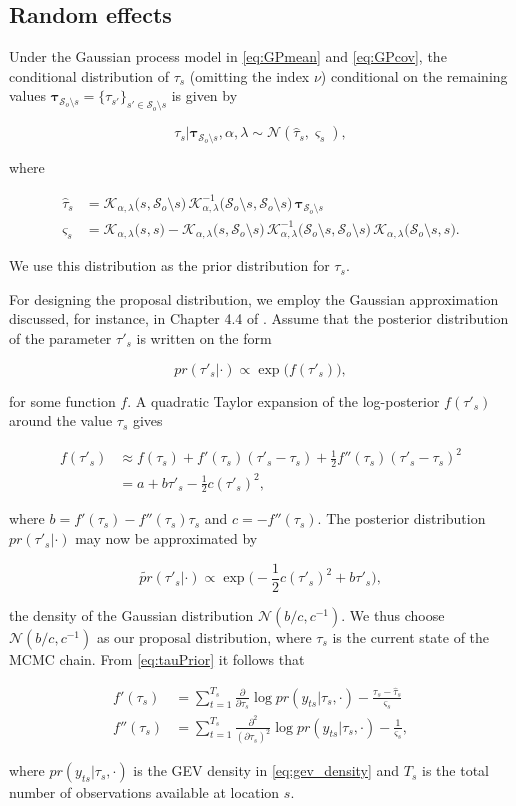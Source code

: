 \documentclass[11pt,english]{article}
\newcommand{\bs}[1]{\boldsymbol{#1}}
\newcommand{\mc}[1]{\mathcal{#1}}
\newcommand{\pderiv}[2]{\frac{\partial #1}{\partial #2}}
\newcommand{\pderivsq}[1]{\frac{\partial^2}{(\partial #1)^2}}
\newcommand{\bl}{\begin{linenomath}}
\newcommand{\el}{\end{linenomath}}
\begin{document}
\subsection{Random effects}

Under the Gaussian process model in \eqref{eq:GPmean} and \eqref{eq:GPcov}, the conditional distribution of $\tau_s$ (omitting the index $\nu$) conditional on the remaining values $\bs{\tau}_{\mc{S}_o \setminus s} = \{ \tau_{s'} \}_{s' \in \mc{S}_o \setminus s}$ is given by 
\bl\begin{equation}\label{eq:tauPrior}
\tau_s | \bs{\tau}_{\mc{S}_o \setminus s}, \alpha, \lambda \sim \mc{N} (\hat{\tau}_s, \varsigma_s),
\end{equation}\el
where 
\bl\begin{align*}
\hat{\tau}_s &= \mc{K}_{\alpha, \lambda}\big(s,\mc{S}_o\setminus s \big) \, \mc{K}^{-1}_{\alpha,\lambda}\big(\mc{S}_o\setminus s, \mc{S}_o\setminus s \big) \, \bs{\tau}_{\mc{S}_o\setminus s}\\
\varsigma_s &= \mc{K}_{\alpha, \lambda}\big(s,s\big) - \mc{K}_{\alpha, \lambda}\big(s,\mc{S}_o\setminus s \big) \, \mc{K}^{-1}_{\alpha,\lambda}\big(\mc{S}_o\setminus s, \mc{S}_o\setminus s\big) \, \mc{K}_{\alpha, \lambda}\big(\mc{S}_o\setminus s,s\big).
\end{align*}\el
We use this distribution as the prior distribution for $\tau_s$. 

For designing the proposal distribution, we employ the Gaussian approximation discussed, for instance, in Chapter 4.4 of \cite{RueHeld2005}.  Assume that the posterior distribution of the parameter $\tau'_s$ is written on the form
\bl\[
pr(\tau'_s| \cdot) \propto \exp \big( f(\tau'_s) \big),
\]\el
for some function $f$.  A quadratic Taylor expansion of the log-posterior $f(\tau'_s)$ around the value $\tau_s$ gives 
\bl\begin{align*}
f(\tau'_s) & \approx f(\tau_s) + f'(\tau_s) ( \tau'_s - \tau_s) + \frac{1}{2} f''(\tau_s) (\tau'_s - \tau_s)^2 \\
& = a + b \tau'_s - \frac{1}{2} c (\tau'_s)^2, 
\end{align*}\el
where $b = f'(\tau_s) - f''(\tau_s) \tau_s$ and $c = -f''(\tau_s)$.  The posterior distribution $pr(\tau'_s | \cdot)$ may now be approximated by 
\bl\[
\widetilde{pr}(\tau'_s | \cdot) \propto \exp \Big( -\frac{1}{2} c (\tau'_s)^2 + b \tau'_s \Big), 
\]\el 
the density of the Gaussian distribution $\mc{N}(b/c, c^{-1})$. We thus choose $\mc{N}(b/c, c^{-1})$ as our proposal distribution, where $\tau_s$ is the current state of the MCMC chain.  From \eqref{eq:tauPrior} it follows that 
\bl\begin{align*}
f'(\tau_s) &= \sum_{t = 1}^{T_s} \pderiv{}{\tau_s} \log pr(y_{ts}|\tau_s, \cdot) - \frac{\tau_s - \hat{\tau}_s}{\varsigma_s}\\
f''(\tau_s) &= \sum_{t = 1}^{T_s} \pderivsq{\tau_s} \log pr(y_{ts}|\tau_s, \cdot) - \frac{1}{\varsigma_s},
\end{align*}\el 
where $pr(y_{ts}|\tau_s, \cdot)$ is the GEV density in \eqref{eq:gev_density} and $T_s$ is the total number of observations available at location $s$.  
\end{document}
